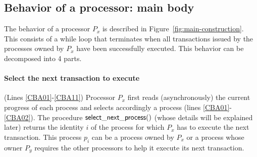 \begin{figure}[h!]
\end{figure}


\subsection{Behavior of a processor: main body}
The behavior of a processor $P_x$ is described in 
Figure~\ref{fig:main-construction}. This  consists of a while loop
that   terminates   when all transactions  issued by the processes owned by
$P_x$ have  been successfully   executed. This  behavior can  be decomposed
into 4 parts. 



\paragraph{Select the next transaction to execute} 
(Lines \ref{CBA01}-\ref{CBA11}) 
Processor $P_x$  first reads (asynchronously) the current  progress of each
process  and  selects accordingly   a process (lines  \ref{CBA01}-\ref{CBA02}). 
The procedure ${\sf select\_next\_process}()$  (whose details will be explained
later) returns  the identity $i$ of the process for which $P_x$ has to 
execute the next transaction. This process  $p_i$ can be a process owned by
$P_x$ or a process whose owner $P_y$ requires the other processors to help it
execute its next transaction.


